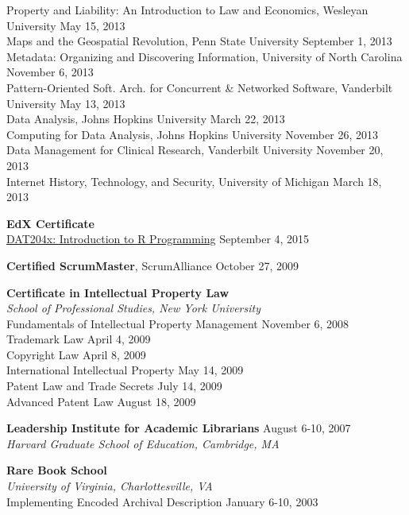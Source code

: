 \documentclass[10pt]{res} %
\begin{document}
\begin{resume}
Property and Liability: An Introduction to Law and Economics, Wesleyan University \hfill  May 15, 2013 \\
Maps and the Geospatial Revolution, Penn State University \hfill  September 1, 2013 \\
Metadata: Organizing and Discovering Information, University of North Carolina \hfill  November 6, 2013 \\
Pattern-Oriented Soft. Arch. for Concurrent \& Networked Software, Vanderbilt University \hfill  May 13, 2013 \\
Data Analysis, Johns Hopkins University \hfill  March 22, 2013 \\
Computing for Data Analysis, Johns Hopkins University \hfill  November 26, 2013 \\
Data Management for Clinical Research, Vanderbilt University \hfill  November 20, 2013 \\
Internet History, Technology, and Security, University of Michigan \hfill  March 18, 2013

{\bf EdX Certificate} \\
\href{https://s3.amazonaws.com/verify.edx.org/downloads/98d8d11c3f9b4ab0a59b92d489d3018c/Certificate.pdf}{DAT204x: Introduction to R Programming} \hfill  September 4, 2015 

{\bf Certified ScrumMaster}, ScrumAlliance \hfill October 27, 2009

{\bf Certificate in Intellectual Property Law} \\
{\sl School of Professional Studies, New York University} \\
Fundamentals of Intellectual Property Management \hfill November 6, 2008 \\
Trademark Law \hfill April 4, 2009 \\
Copyright Law \hfill April 8, 2009 \\
International Intellectual Property \hfill May 14, 2009 \\
Patent Law and Trade Secrets \hfill July 14, 2009 \\
Advanced Patent Law \hfill August 18, 2009

{\bf Leadership Institute for Academic Librarians} \hfill August 6-10, 2007 \\
{\sl Harvard Graduate School of Education, Cambridge, MA } 

{\bf Rare Book School} \\
{\sl University of Virginia, Charlottesville, VA } \\
Implementing Encoded Archival Description \hfill January 6-10, 2003 


\end{resume}
\end{document}
